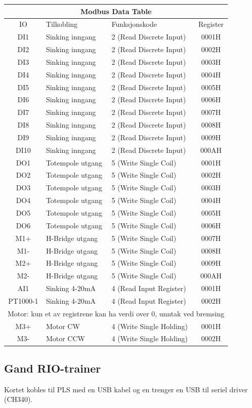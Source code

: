 \small
\begin{tabular}{|c|l|l|c|}
\hline 
\multicolumn{4}{|c|}{Modbus Data Table}\tabularnewline
\hline 
\hline 
	IO & Tilkobling & Funksjonskode & Register \tabularnewline
\hline 
	DI1 & Sinking inngang & 2 (Read Discrete Input) & 0001H \tabularnewline
\hline 
	DI2 & Sinking inngang & 2 (Read Discrete Input) & 0002H \tabularnewline
\hline 
	DI3 & Sinking inngang & 2 (Read Discrete Input) & 0003H \tabularnewline
\hline 
	DI4 & Sinking inngang & 2 (Read Discrete Input) & 0004H \tabularnewline
\hline 
	DI5 & Sinking inngang & 2 (Read Discrete Input) & 0005H \tabularnewline
\hline 
	DI6 & Sinking inngang & 2 (Read Discrete Input) & 0006H \tabularnewline
\hline 
	DI7 & Sinking inngang & 2 (Read Discrete Input) & 0007H \tabularnewline
\hline 
	DI8 & Sinking inngang & 2 (Read Discrete Input) & 0008H \tabularnewline
\hline 
	DI9 & Sinking inngang & 2 (Read Discrete Input) & 0009H \tabularnewline
\hline 
	DI10 & Sinking inngang & 2 (Read Discrete Input) & 000AH\tabularnewline
\hline 
	DO1 & Totempole utgang & 5 (Write Single Coil) & 0001H \tabularnewline
\hline 
	DO2 & Totempole utgang & 5 (Write Single Coil) & 0002H \tabularnewline
\hline 
	DO3 & Totempole utgang & 5 (Write Single Coil) & 0003H \tabularnewline
\hline 
	DO4 & Totempole utgang & 5 (Write Single Coil) & 0004H \tabularnewline
\hline 
	DO5 & Totempole utgang & 5 (Write Single Coil) & 0005H \tabularnewline
\hline 
	DO6 & Totempole utgang & 5 (Write Single Coil) & 0006H \tabularnewline
\hline 
	M1+ & H-Bridge utgang & 5 (Write Single Coil) & 0007H \tabularnewline
\hline 
	M1- & H-Bridge utgang & 5 (Write Single Coil) & 0008H \tabularnewline
\hline 
	M2+ & H-Bridge utgang & 5 (Write Single Coil) & 0009H \tabularnewline
\hline 
	M2- & H-Bridge utgang & 5 (Write Single Coil) & 000AH \tabularnewline
\hline 
	AI1 & Sinking 4-20mA & 4 (Read Input Register) & 0001H \tabularnewline
\hline 
	PT1000-1 & Sinking 4-20mA & 4 (Read Input Register) & 0002H \tabularnewline
\hline 
\multicolumn{4}{|l|}{Motor: kun et av registrene kan ha verdi over 0, unntak ved bremsing}\tabularnewline
\hline 
	M3+ &  Motor CW & 4 (Write Single Holding) & 0001H \tabularnewline
\hline 
	M3- &  Motor CCW & 4 (Write Single Holding) & 0002H \tabularnewline
\hline 
\end{tabular}
\normalsize
\vfil \eject
\subsection{Gand RIO-trainer}

Kortet kobles til PLS med en USB kabel og en trenger en USB til seriel
driver (CH340). 


